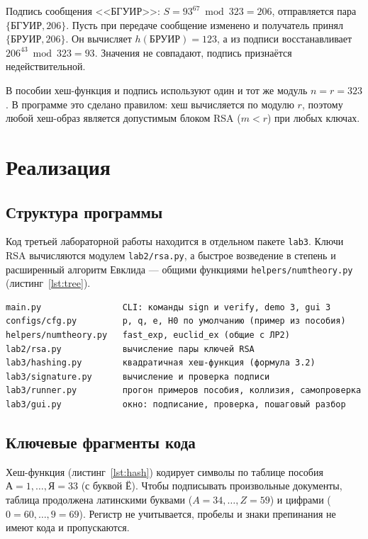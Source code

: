 \documentclass[14pt,a4paper]{extarticle}
\begin{document}
Подпись сообщения <<БГУИР>>: $S = 93^{67} \bmod 323 = 206$, отправляется пара
$\{\text{БГУИР}, 206\}$. Пусть при передаче сообщение изменено и получатель принял
$\{\text{БРУИР}, 206\}$. Он вычисляет $h(\text{БРУИР}) = 123$, а из подписи
восстанавливает $206^{43} \bmod 323 = 93$. Значения не совпадают, подпись
признаётся недействительной.

В пособии хеш-функция и подпись используют один и тот же модуль $n = r = 323$.
В программе это сделано правилом: хеш вычисляется по модулю $r$, поэтому любой
хеш-образ является допустимым блоком RSA ($m < r$) при любых ключах.

\section{Реализация}

\subsection{Структура программы}

Код третьей лабораторной работы находится в отдельном пакете \texttt{lab3}. Ключи
RSA вычисляются модулем \texttt{lab2/rsa.py}, а быстрое возведение в степень и
расширенный алгоритм Евклида --- общими функциями \texttt{helpers/numtheory.py}
(листинг~\ref{lst:tree}).

\begin{Verbatim}[fontsize=\footnotesize, frame=single, samepage=true]
main.py                CLI: команды sign и verify, demo 3, gui 3
configs/cfg.py         p, q, e, H0 по умолчанию (пример из пособия)
helpers/numtheory.py   fast_exp, euclid_ex (общие с ЛР2)
lab2/rsa.py            вычисление пары ключей RSA
lab3/hashing.py        квадратичная хеш-функция (формула 3.2)
lab3/signature.py      вычисление и проверка подписи
lab3/runner.py         прогон примеров пособия, коллизия, самопроверка
lab3/gui.py            окно: подписание, проверка, пошаговый разбор
\end{Verbatim}

\subsection{Ключевые фрагменты кода}

Хеш-функция (листинг~\ref{lst:hash}) кодирует символы по таблице пособия
$\text{А} = 1, \dots, \text{Я} = 33$ (с буквой Ё). Чтобы подписывать произвольные
документы, таблица продолжена латинскими буквами ($A = 34, \dots, Z = 59$) и цифрами
($0 = 60, \dots, 9 = 69$). Регистр не учитывается, пробелы и знаки препинания не
имеют кода и пропускаются.
\end{document}
